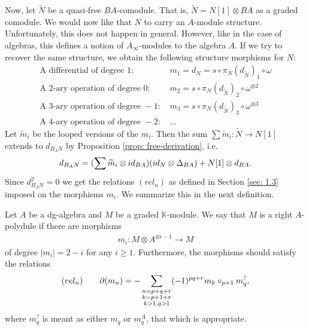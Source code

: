 \documentclass[../thesis.tex]{subfiles}
\begin{document}
            Now, let $\widetilde{N}$ be a quasi-free $BA$-comodule. That is, $\widetilde{N} = N[1] \otimes BA$ as a graded comodule. We would now like that $N$ to carry an $A$-module structure. Unfortunately, this does not happen in general. However, like in the case of algebras, this defines a notion of $A_\infty$-modules to the algebra $A$. If we try to recover the same structure, we obtain the following structure morphisms for $N$:
            \begin{align*}
                \text{A differential of degree }1\text{: }& m_1 = d_{N} = s\circ \pi_N (d_{\widetilde{N}})_1 \circ \omega\\
                \text{A 2-ary operation of degree }0\text{: }& m_2 = s\circ \pi_N (d_{\widetilde{N}})_2 \circ \omega^{\otimes 2}\\
                \text{A 3-ary operation of degree }-1\text{: }& m_3 = s\circ \pi_N (d_{\widetilde{N}})_3 \circ \omega^{\otimes 3}\\
                \text{A 4-ary operation of degree }-2\text{: }& \text{...}
            \end{align*}
            Let $\widetilde{m}_i$ be the looped versions of the $m_i$. Then the sum $\sum \widetilde{m}_i : \widetilde{N} \rightarrow N[1]$ extends to $d_{B_AN}$ by Proposition \ref{prop: free-derivation}, i.e. 
            \begin{align*}
                d_{B_AN} = (\sum \widetilde{m}_i \otimes id_{BA})(id_N \otimes \Delta_{BA}) + N[1]\otimes d_{BA}\tt{.}
            \end{align*}
            Since $d_{B_AN}^2 = 0$ we get the relations $(rel_n)$ as defined in Section \ref{sec: 1.3} imposed on the morphisms $m_i$. We summarize this in the next definition.

            \begin{definition}[$A$-polydule]
                Let $A$ be a dg-algebra and $M$ be a graded $\mathbb{K}$-module. We say that $M$ is a right $A$-polydule if there are morphisms
                \begin{align}
                    m_i : M \otimes A^{\otimes i - 1} \rightarrow M
                \end{align}
                of degree $|m_i| = 2 - i$ for any $i \geq 1$. Furthermore, the morphisms should satisfy the relations
                \begin{align*}
                    (rel_n) \qquad \partial(m_n) = - \sum_{\substack{n = p + q + r \\ k = p + 1 + r \\ k > 1, q > 1}}(-1)^{pq+r}m_k\circ_{p+1}m_q^?\tt{,}
                \end{align*}
                where $m_q^?$ is meant as either $m_q$ or $m_q^A$, that which is appropriate.
            \end{definition}
            
\end{document}
